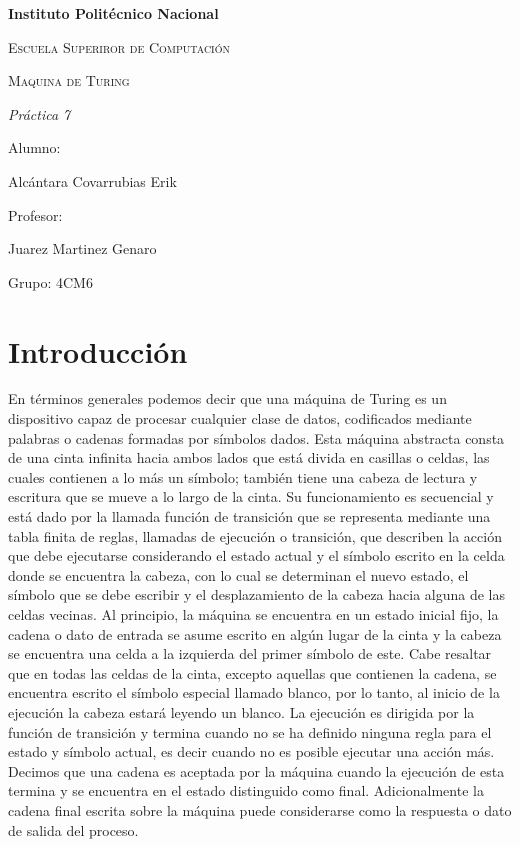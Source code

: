 \documentclass{article}
\begin{document}
\begin{titlepage}
\centering

{\bfseries\LARGE Instituto Polit\'ecnico Nacional \par}
\vspace{1cm}
{\scshape\Large Escuela Superiror de Computaci\'on \par}
\vspace{3cm}
{\scshape\Huge  Maquina de Turing \par}
\vspace{3cm}
{\itshape\Large Pr\'actica 7 \par}
\vfill
{\Large Alumno: \par}
{\Large Alcántara Covarrubias Erik \par}
{\Large Profesor: \par}
{\Large Juarez Martinez Genaro \par}
{\Large Grupo: 4CM6\par}
\vfill
\end{titlepage}
\section{Introducci\'on}
En términos generales podemos decir que una máquina de Turing es un dispositivo capaz de procesar cualquier clase de datos, codificados mediante palabras o cadenas formadas por símbolos dados. Esta máquina abstracta consta de una cinta infinita hacia ambos lados que está divida en casillas o celdas, las cuales contienen a lo más un símbolo; también tiene una cabeza de lectura y escritura que se mueve a lo largo de la cinta. Su funcionamiento es secuencial y está dado por la llamada función de transición que se representa mediante una tabla finita de reglas, llamadas de ejecución o transición, que describen la acción que debe ejecutarse considerando el estado actual y el símbolo escrito en la celda donde se encuentra la cabeza, con lo cual se determinan el nuevo estado, el símbolo que se debe escribir y el desplazamiento de la cabeza hacia alguna de las celdas vecinas. \newline Al principio, la máquina se encuentra en un estado inicial fijo, la cadena o dato de entrada se asume escrito en algún lugar de la cinta y la cabeza se encuentra una celda a la izquierda del primer símbolo de este. Cabe resaltar que en todas las celdas de la cinta, excepto aquellas que contienen la cadena, se encuentra escrito el símbolo especial llamado blanco, por lo tanto, al inicio de la ejecución la cabeza estará leyendo un blanco. \newline La ejecución es dirigida por la función de transición y termina cuando no se ha definido ninguna regla para el estado y símbolo actual, es decir cuando no es posible ejecutar una acción más. Decimos que una cadena es aceptada por la máquina cuando la ejecución de esta termina y se encuentra en el estado distinguido como final. Adicionalmente la cadena final escrita sobre la máquina puede considerarse como la respuesta o dato de salida del proceso.
\end{document}
